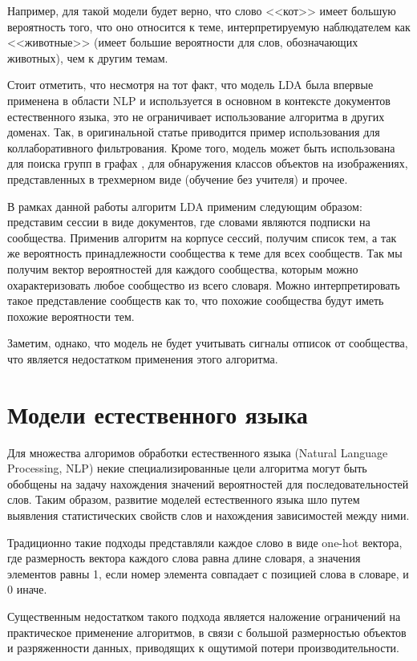 \documentclass[times,specification,annotation]{itmo-student-thesis}
\begin{document}
Например, для такой модели будет верно, что слово <<кот>> имеет большую вероятность того, что оно относится к теме, интерпретируемую наблюдателем как <<животные>> (имеет большие вероятности для слов, обозначающих животных), чем к другим темам. 

Стоит отметить, что несмотря на тот факт, что модель LDA была впервые применена в области NLP и используется в основном в контексте документов естественного языка, это не ограничивает использование алгоритма в других доменах. Так, в оригинальной статье \cite{lda2003} приводится пример использования для коллаборативного фильтрования. Кроме того, модель может быть использована для поиска групп в графах \cite{Henderson2009}, для обнаружения классов объектов на изображениях, представленных в трехмерном виде (обучение без учителя) \cite{Endres2009} и прочее.

В рамках данной работы алгоритм LDA применим следующим образом: представим сессии в виде документов, где словами являются подписки на сообщества. Применив алгоритм на корпусе сессий, получим список тем, а так же вероятность принадлежности сообщества к теме для всех сообществ. Так мы получим вектор вероятностей для каждого сообщества, которым можно охарактеризовать любое сообщество из всего словаря. Можно интерпретировать такое представление сообществ как то, что похожие сообщества будут иметь похожие вероятности тем. 
 
Заметим, однако, что модель не будет учитывать сигналы отписок от сообщества, что является недостатком применения этого алгоритма. 

\section{Модели естественного языка}\label{sec:nlp-intro}

Для множества алгоримов обработки естественного языка (Natural Language Processing, NLP) некие специализированные цели алгоритма могут быть обобщены на задачу нахождения значений вероятностей для последовательностей слов.
Таким образом, развитие моделей естественного языка шло путем выявления статистических свойств слов и нахождения зависимостей между ними.

Традиционно такие подходы представляли каждое слово в виде one-hot вектора, где размерность вектора каждого слова равна длине словаря, а значения элементов равны 1, если номер элемента совпадает с позицией слова в словаре, и 0 иначе.  

Существенным недостатком такого подхода является наложение ограничений на практическое применение алгоритмов, в связи с большой размерностью объектов и разряженности данных, приводящих к ощутимой потери производительности.
\end{document}
